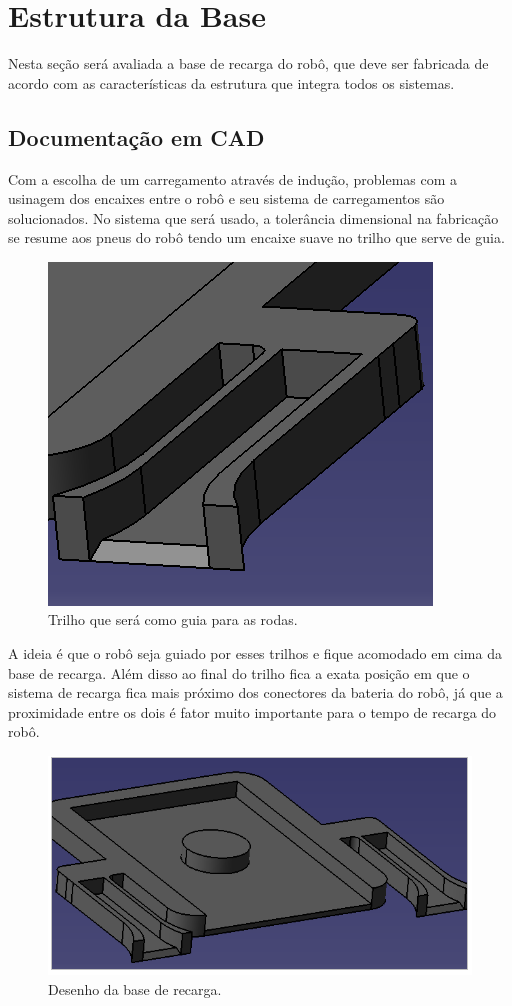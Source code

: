 \section{Estrutura da Base}

Nesta seção será avaliada a base de recarga do robô, que deve ser fabricada de acordo com as características da estrutura que integra todos os sistemas.

\subsection{Documentação em CAD}
Com a escolha de um carregamento através de indução, problemas com a usinagem dos encaixes entre o robô e seu sistema de carregamentos são solucionados. No sistema que será usado, a tolerância dimensional na fabricação se resume aos pneus do robô tendo um encaixe suave no trilho que serve de guia.

\begin{figure}[H]
	\centering
	\includegraphics[scale=0.7]{figuras/trilho_base.png}
	\caption{Trilho que será como guia para as rodas.}
	\label{img:trilho_base}
\end{figure}

A ideia é que o robô seja guiado por esses trilhos e fique acomodado em cima da base de recarga. Além disso ao final do trilho fica a exata posição em que o sistema de recarga fica mais próximo dos conectores da bateria do robô, já que a proximidade entre os dois é fator muito importante para o tempo de recarga do robô.

\begin{figure}[H]
	\centering
	\includegraphics[scale=0.7]{figuras/desenho_base_recarga.png}
	\caption{Desenho da base de recarga.}
	\label{img:desenho_base_recarga}
\end{figure}
